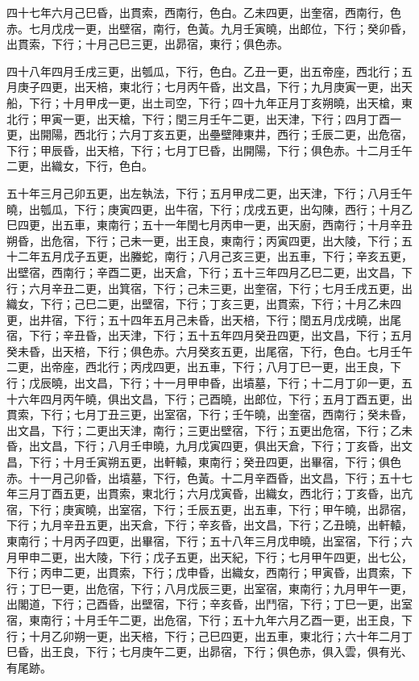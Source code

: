 \begin{pinyinscope}
四十七年六月己巳昏，出貫索，西南行，色白。乙未四更，出奎宿，西南行，色赤。七月戊戌一更，出壁宿，南行，色黃。九月壬寅曉，出郎位，下行；癸卯昏，出貫索，下行；十月己巳三更，出昴宿，東行；俱色赤。

四十八年四月壬戌三更，出瓠瓜，下行，色白。乙丑一更，出五帝座，西北行；五月庚子四更，出天棓，東北行；七月丙午昏，出文昌，下行；九月庚寅一更，出天船，下行；十月甲戌一更，出土司空，下行；四十九年正月丁亥朔曉，出天槍，東北行；甲寅一更，出天槍，下行；閏三月壬午二更，出天津，下行；四月丁酉一更，出開陽，西北行；六月丁亥五更，出壘壁陣東井，西行；壬辰二更，出危宿，下行；甲辰昏，出天棓，下行；七月丁巳昏，出開陽，下行；俱色赤。十二月壬午二更，出織女，下行，色白。

五十年三月己卯五更，出左執法，下行；五月甲戌二更，出天津，下行；八月壬午曉，出瓠瓜，下行；庚寅四更，出牛宿，下行；戊戌五更，出勾陳，西行；十月乙巳四更，出五車，東南行；五十一年閏七月丙申一更，出天廚，西南行；十月辛丑朔昏，出危宿，下行；己未一更，出王良，東南行；丙寅四更，出大陵，下行；五十二年五月戊子五更，出螣蛇，南行；八月己亥三更，出五車，下行；辛亥五更，出壁宿，西南行；辛酉二更，出天倉，下行；五十三年四月乙巳二更，出文昌，下行；六月辛丑二更，出箕宿，下行；己未三更，出奎宿，下行；七月壬戌五更，出織女，下行；己巳二更，出壁宿，下行；丁亥三更，出貫索，下行；十月乙未四更，出井宿，下行；五十四年五月己未昏，出天棓，下行；閏五月戊戌曉，出尾宿，下行；辛丑昏，出天津，下行；五十五年四月癸丑四更，出文昌，下行；五月癸未昏，出天棓，下行；俱色赤。六月癸亥五更，出尾宿，下行，色白。七月壬午二更，出帝座，西北行；丙戌四更，出五車，下行；八月丁巳一更，出王良，下行；戊辰曉，出文昌，下行；十一月甲申昏，出墳墓，下行；十二月丁卯一更，五十六年四月丙午曉，俱出文昌，下行；己酉曉，出郎位，下行；五月丁酉五更，出貫索，下行；七月丁丑三更，出室宿，下行；壬午曉，出奎宿，西南行；癸未昏，出文昌，下行；二更出天津，南行；三更出壁宿，下行；五更出危宿，下行；乙未昏，出文昌，下行；八月壬申曉，九月戊寅四更，俱出天倉，下行；丁亥昏，出文昌，下行；十月壬寅朔五更，出軒轅，東南行；癸丑四更，出畢宿，下行；俱色赤。十一月己卯昏，出墳墓，下行，色黃。十二月辛酉昏，出文昌，下行；五十七年三月丁酉五更，出貫索，東北行；六月戊寅昏，出織女，西北行；丁亥昏，出亢宿，下行；庚寅曉，出室宿，下行；壬辰五更，出五車，下行；甲午曉，出昴宿，下行；九月辛丑五更，出天倉，下行；辛亥昏，出文昌，下行；乙丑曉，出軒轅，東南行；十月丙子四更，出畢宿，下行；五十八年三月戊申曉，出室宿，下行；六月甲申二更，出大陵，下行；戊子五更，出天紀，下行；七月甲午四更，出七公，下行；丙申二更，出貫索，下行；戊申昏，出織女，西南行；甲寅昏，出貫索，下行；丁巳一更，出危宿，下行；八月戊辰三更，出室宿，東南行；九月甲午一更，出閣道，下行；己酉昏，出壁宿，下行；辛亥昏，出鬥宿，下行；丁巳一更，出室宿，東南行；十月壬午二更，出危宿，下行；五十九年六月乙酉一更，出王良，下行；十月乙卯朔一更，出天棓，下行；己巳四更，出五車，東北行；六十年二月丁巳昏，出王良，下行；七月庚午二更，出昴宿，下行；俱色赤，俱入雲，俱有光、有尾跡。


\end{pinyinscope}
